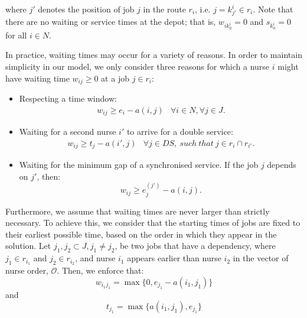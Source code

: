 \documentclass[a4paper,11pt,authoryear]{elsarticle}
\begin{document}
\noindent where $j'$ denotes the position of job $j$ in the route $r_i$, i.e. $j = k^i_{j'} \in r_i$. Note that there are no waiting or service times at the depot; that is, $w_{ik^i_0} = 0$ and $s_{k^i_0} = 0 $ for all $i \in N$.

In practice, waiting times may occur for a variety of reasons. In order to maintain simplicity in our model, we only consider three reasons for which a nurse $i$ might have waiting time $w_{ij} \geq 0$ at a job $j \in r_i$:
\begin{itemize}
    \item Respecting a time window: 
    \begin{align}
        w_{ij} \geq e_i - a(i,j) & \forall i \in N, \forall j \in J.
    \end{align}
    \item Waiting for a second nurse $i'$ to arrive for a double service:
    \begin{align}
        w_{i j} \geq t_j - a(i',j) & \forall j \in DS,\ such\ that\ j \in r_{i} \cap r_{i'}.
    \end{align}
    \item Waiting for the minimum gap of a synchronised service. If the job $j$ depends on $j'$, then:
    \begin{equation}\label{eqn:waitingforsynchronised}
        w_{ij} \geq e^{(j')}_{j} - a(i,j).
    \end{equation}
\end{itemize}

\noindent Furthermore, we assume that waiting times are never larger than strictly necessary. To achieve this, we consider that the starting times of jobs are fixed to their earliest possible time, based on the order in which they appear in the solution.  Let $j_1, j_2 \subset J, j_1 \neq j_2$, be two jobs that have a dependency, where $j_1 \in r_{i_1}$ and $j_2 \in r_{i_2}$, and nurse $i_1$ appears earlier than nurse $i_2$ in the vector of nurse order, $\mathcal{O}$. Then, we enforce that:
\begin{equation}\label{eqn:earliestpossiblestartassumption1}
    w_{i_1 j_1} = \max \{0, e_{j_1} - a(i_1,j_1)\}
\end{equation}
and
\begin{equation}\label{eqn:earliestpossiblestartassumption2}
    t_{j_1} = \max \{ a(i_1,j_1), e_{j_1} \}
\end{equation}
\end{document}
